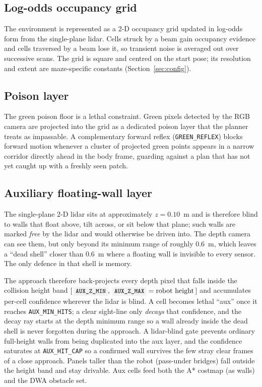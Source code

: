 \documentclass[11pt,a4paper]{article}
\newcommand{\code}[1]{\colorbox{codegray}{\texttt{\small #1}}}
\begin{document}
\subsection{Log-odds occupancy grid}
The environment is represented as a 2-D occupancy grid updated in log-odds form
from the single-plane lidar. Cells struck by a beam gain occupancy evidence and
cells traversed by a beam lose it, so transient noise is averaged out over
successive scans. The grid is square and centred on the start pose; its
resolution and extent are maze-specific constants (Section~\ref{sec:config}).

\subsection{Poison layer}
The green poison floor is a lethal constraint. Green pixels detected by the RGB
camera are projected into the grid as a dedicated poison layer that the planner
treats as impassable. A complementary forward reflex
(\code{GREEN\_REFLEX}) blocks forward motion whenever a cluster of projected
green points appears in a narrow corridor directly ahead in the body frame,
guarding against a plan that has not yet caught up with a freshly seen patch.

\subsection{Auxiliary floating-wall layer}
The single-plane 2-D lidar sits at approximately $z=0.10$~m and is therefore
blind to walls that float above, tilt across, or sit below that plane; such
walls are marked \emph{free} by the lidar and would otherwise be driven into.
The depth camera can see them, but only beyond its minimum range of roughly
$0.6$~m, which leaves a ``dead shell'' closer than $0.6$~m where a floating wall
is invisible to every sensor. The only defence in that shell is memory.

The approach therefore back-projects every depth pixel that falls inside the
collision height band $[\,\code{AUX\_Z\_MIN},\,\code{AUX\_Z\_MAX}=\text{robot
height}\,]$ and accumulates per-cell confidence wherever the lidar is blind. A
cell becomes lethal ``aux'' once it reaches \code{AUX\_MIN\_HITS}; a clear
sight-line only \emph{decays} that confidence, and the decay ray starts at the
depth minimum range so a wall already inside the dead shell is never forgotten
during the approach. A lidar-blind gate prevents ordinary full-height walls
from being duplicated into the aux layer, and the confidence saturates at
\code{AUX\_HIT\_CAP} so a confirmed wall survives the few stray clear frames of
a close approach. Panels taller than the robot (pass-under bridges) fall outside
the height band and stay drivable. Aux cells feed both the A* costmap (as walls)
and the DWA obstacle set.
\end{document}
